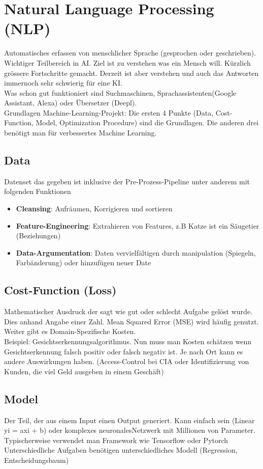 \section{Natural Language Processing (NLP)}
Automatisches erfassen von menschlicher Sprache (gesprochen oder geschrieben). Wichtiger Teilbereich in AI. Ziel ist zu verstehen was ein Mensch will. Kürzlich grössere Fortschritte gemacht. Derzeit ist aber verstehen und auch das Antworten immernoch sehr schwierig für eine KI.\\
Was schon gut funktioniert sind Suchmaschinen, Sprachassistenten(Google Assistant, Alexa) oder Übersetzer (Deepl).
\\
\textcolor{myblue}{Grundlagen Machine-Learning-Projekt:} Die ersten 4 Punkte (Data, Cost-Function, Model, Optimization Procedure) sind die Grundlagen. Die anderen drei benötigt man für verbessertes Machine Learning.
\subsection{Data}
Datenset das gegeben ist inklusive der Pre-Prozess-Pipeline unter anderem mit folgenden Funktionen
\begin{itemize}
\item \textbf{Cleansing}: Aufräumen, Korrigieren und sortieren
\item \textbf{Feature-Engineering}: Extrahieren von Features, z.B Katze ist ein Säugetier (Beziehungen)
\item \textbf{Data-Argumentation}: Daten vervielfältigen durch manipulation (Spiegeln, Farbänderung) oder hinzufügen neuer Date
\end{itemize}

\subsection{Cost-Function (Loss)}
Mathematischer Ausdruck der sagt wie gut oder schlecht Aufgabe gelöst wurde. Dies anhand Angabe einer Zahl. Mean Squared Error (MSE) wird häufig genutzt. Weiter gibt es Domain-Spezifische Kosten.
\\
Beispiel: Gesichtserkennungsalgorithmus. Nun muss man Kosten schätzen wenn Gesichtserkennung falsch positiv oder falsch
negativ ist. Je nach Ort kann es andere Auswirkungen haben. (Access-Control bei CIA oder Identifizierung von Kunden, die viel
Geld ausgeben in einem Geschäft)
\subsection{Model}
Der Teil, der aus einem Input einen Output generiert. Kann einfach sein (Linear yi = axi + b) oder komplexes neuronalesNetzwerk mit Millionen von Parameter.
\\
Typischerweise verwendet man Framework wie Tensorflow oder Pytorch
\\
Unterschiedliche Aufgaben benötigen unterschiedliches Modell (Regression, Entscheidungsbaum)
